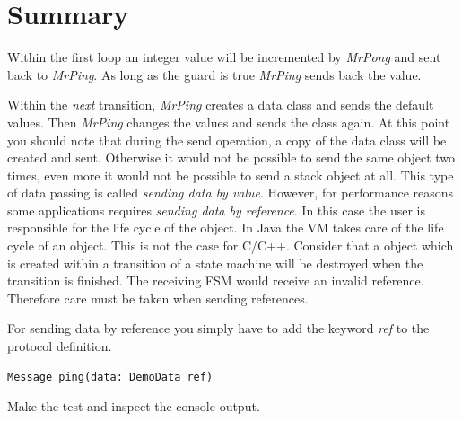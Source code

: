 \section{Summary}

Within the first loop an integer value will be incremented by \textit{MrPong} and sent back to 
\textit{MrPing}. As long as the guard is true \textit{MrPing} sends back the value.

Within the \textit{next} transition, \textit{MrPing} creates a data class and sends the default values. 
Then \textit{MrPing} changes the values and sends the class again. At this point you should note that 
during the send operation, a copy of the data class will be created and sent. Otherwise it would not be 
possible to send the same object two times, even more it would not be possible to send a stack object at 
all. This type of data passing is called \textit{sending data by value}.
However, for performance reasons some applications requires \textit{sending data by reference}. In this 
case the user is responsible for the life cycle of the object. In Java the VM takes care of the life cycle 
of an object. This is not the case for C/C++. Consider that a object which is created within a transition 
of a state machine will be destroyed when the transition is finished. The receiving FSM would receive an 
invalid reference. Therefore care must be taken when sending references.      

For sending data by reference you simply have to add the keyword \textit{ref} to the protocol definition.
 
\begin{verbatim}Message ping(data: DemoData ref)\end{verbatim}

Make the test and inspect the console output.
